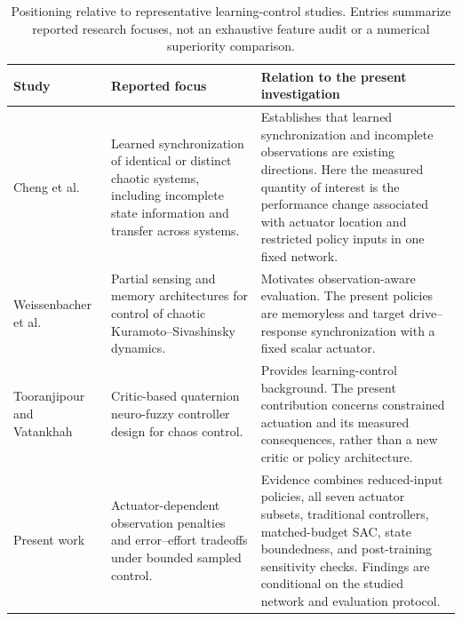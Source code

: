 \begin{table}[pos=!t,width=\textwidth]
\centering\small
\caption{Positioning relative to representative learning-control studies. Entries summarize reported research focuses, not an exhaustive feature audit or a numerical superiority comparison.}
\label{tab:research_positioning}
\setlength{\tabcolsep}{4pt}
\begin{tabular}{@{}>{\raggedright\arraybackslash}p{}>{\raggedright\arraybackslash}p{}>{\raggedright\arraybackslash}p{}@{}}
\toprule
Study & Reported focus & Relation to the present investigation \\
\midrule
Cheng et al.~\cite{cheng2023deep,cheng2025generalized} & Learned synchronization of identical or distinct chaotic systems, including incomplete state information and transfer across systems. & Establishes that learned synchronization and incomplete observations are existing directions. Here the measured quantity of interest is the performance change associated with actuator location and restricted policy inputs in one fixed network. \\
Weissenbacher et al.~\cite{weissenbacher2025reinforcement} & Partial sensing and memory architectures for control of chaotic Kuramoto--Sivashinsky dynamics. & Motivates observation-aware evaluation. The present policies are memoryless and target drive--response synchronization with a fixed scalar actuator. \\
Tooranjipour and Vatankhah~\cite{tooranjipour2018critic} & Critic-based quaternion neuro-fuzzy controller design for chaos control. & Provides learning-control background. The present contribution concerns constrained actuation and its measured consequences, rather than a new critic or policy architecture. \\
Present work & Actuator-dependent observation penalties and error--effort tradeoffs under bounded sampled control. & Evidence combines reduced-input policies, all seven actuator subsets, traditional controllers, matched-budget SAC, state boundedness, and post-training sensitivity checks. Findings are conditional on the studied network and evaluation protocol. \\
\bottomrule
\end{tabular}
\end{table}
